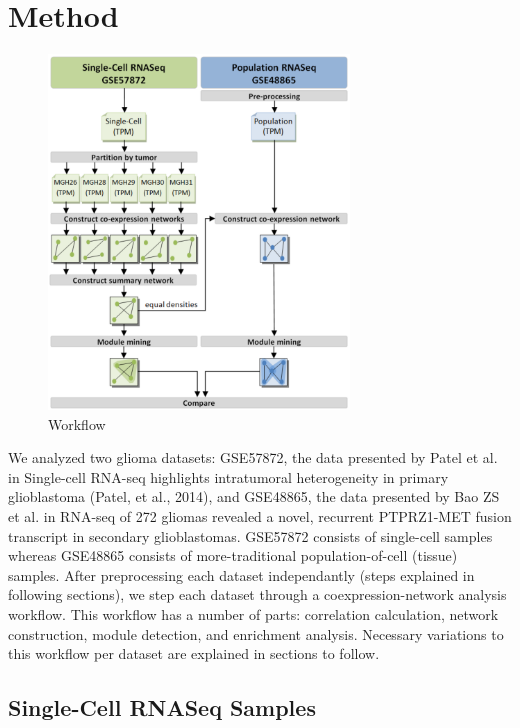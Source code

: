 \documentclass[11pt,twoside,a4paper]{article}
\begin{document}
\section{Method}

\begin{figure}[t]
\centering
\includegraphics[width=80mm]{Figures/Workflow}
\caption{Workflow}
\label{Workflow Figure}
\end{figure}

We analyzed two glioma datasets: GSE57872, the data presented by Patel et al. in Single-cell RNA-seq highlights intratumoral heterogeneity in primary glioblastoma (Patel, et al., 2014), and GSE48865, the data presented by Bao ZS et al. in RNA-seq of 272 gliomas revealed a novel, recurrent PTPRZ1-MET fusion transcript in secondary glioblastomas. GSE57872 consists of single-cell samples whereas GSE48865 consists of more-traditional population-of-cell (tissue) samples. After preprocessing each dataset independantly (steps explained in following sections), we step each dataset through a coexpression-network analysis workflow. This workflow has a number of parts: correlation calculation, network construction, module detection, and enrichment analysis. Necessary variations to this workflow per dataset are explained in sections to follow. 

\subsection{Single-Cell RNASeq Samples }
\end{document}
